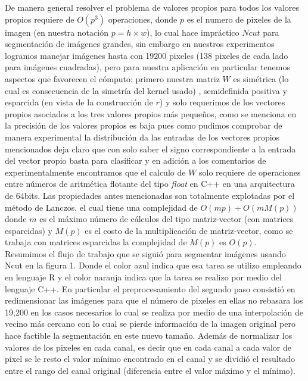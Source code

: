 \documentclass[conference]{IEEEtran}
\begin{document}
De manera general resolver el problema de valores propios para todos los valores propios requiere de $O(p^3)$ operaciones, donde $p$ es el numero de pixeles de la imagen (en nuestra notación $p = h \times w$), lo cual hace impráctico $Ncut$ para segmentación de imágenes grandes, sin embargo en nuestros experimentos logramos manejar imágenes hasta con 19200 pixeles (138 pixeles de cada lado para imágenes cuadradas), pero para nuestra aplicación en particular tenemos aspectos que favorecen el cómputo: primero nuestra matriz $W$ es simétrica (lo cual es consecuencia de la simetría del kernel usado) , semidefinida positiva y esparcida (en vista de la construcción de $r$) y solo requerimos de los vectores propios asociados a los tres valores propios más pequeños, como se menciona en \cite{Ncut} la precisión de los valores propios es baja pues como pudimos comprobar de manera experimental la distribución da las entradas de los vectores propios mencionados deja claro que con solo saber el signo correspondiente a la entrada del vector propio basta para clasificar y en adición a los comentarios de \cite{Ncut}  experimentalmente encontramos que el calculo de $W$ solo requiere de operaciones entre números de aritmética flotante del tipo \textit{float} en C++ en una arquitectura de 64bits. Las propiedades antes mencionadas son totalmente explotadas por el método de Lanczos, el cual tiene una complejidad de $O(mp)+O(mM(p))$ \cite{MatrixC} donde $m$ es el máximo número de cálculos del tipo matriz-vector (con matrices esparcidas) y $M(p)$ es el costo de la multiplicación de matriz-vector, como se trabaja con matrices esparcidas la complejidad de $M(p)$ es $O(p)$.\\   
Resumimos el flujo de trabajo que se siguió para segmentar imágenes usando Ncut en la figura 1. Donde el color azul indica que esa tarea se utilizo empleando en lenguaje R y el color naranja indica que la tarea se realizo por medio del lenguaje C++. En particular el preprocesamiento del segundo paso consistió en redimensionar las imágenes para que el número de pixeles en ellas no rebasara los 19,200 en los casos necesarios lo cual se realiza por medio de una interpolación de vecino más cercano con lo cual se pierde información de la imagen original pero hace factible la segmentación en este nuevo tamaño. Además de normalizar los valores de los pixeles en cada canal, es decir que en cada canal a cada valor de pixel se le resto el valor mínimo encontrado en el canal y se dividió el resultado entre el rango del canal original (diferencia entre el valor máximo y el mínimo).\\
\end{document}
